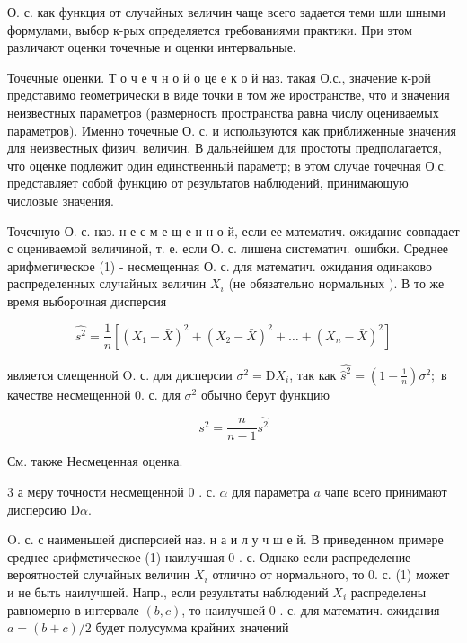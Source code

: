 \documentclass[10pt]{article}
\begin{document}
О. с. как функция от случайных величин чаще всего задается теми шли шными формулами, выбор к-рых определяется требованиями практики. При этом различают оценки точечные и оценки интервальные.



Точечные оценки. Т о ч е ч н о й $о$ це е к о й наз. такая О.с., значение к-рой представимо геометрически в виде точки в том же иространстве, что и значения неизвестных параметров (размерность пространства равна числу оцениваемых параметров). Именно точечные О. с. и используются как приближенные значения для неизвестных физич. величин. В дальнейшем для простоты предполагается, что оценке подлөжит один единственный параметр; в этом случае точечная О.с. представляет собой функцию от результатов наблюдений, принимающую числовые значения.



Точечную О. с. наз. н е с м е щ е н н о й, если ее математич. ожидание совпадает с оцениваемой величиной, т. е. если О. с. лишена систематич. ошибки. Среднее арифметическое (1) - несмещенная О. с. для математич. ожидания одинаково распределенных случайных величин $X_{i}$ (не обязательно нормальных $)$. В то же время выборочная дисперсия



\[

\hat{s^{2}}=\frac{1}{n}\left[\left(X_{1}-\bar{X}\right)^{2}+\left(X_{2}-\bar{X}\right)^{2}+\ldots+\left(X_{n}-\bar{X}\right)^{2}\right]

\]



является смещенной $\mathrm{O}$. с. для дисперсии $\sigma^{2}=\mathrm{D} X_{i}$, так как $\hat{\hat{s}^{2}}=\left(1-\frac{1}{n}\right) \sigma^{2} ;$ в качестве несмещенной 0. с. для $\sigma^{2}$ обычно берут функцию



\[

s^{2}=\frac{n}{n-1} \hat{s^{2}}

\]



См. также Несмеценная оценка.



3 а меру точности несмещенной 0 . с. $\alpha$ для параметра $a$ чапе всего принимают дисперсию $\mathrm{D} \alpha$.



O. с. с наименьшей дисперсией наз. н а и л у ч ш е й. В приведенном примере среднее арифметическое (1) наилучшая 0 . с. Однако если распределение вероятностей случайных величин $X_{i}$ отлично от нормального, то 0. с. (1) может и не быть наилучшей. Напр., если результаты наблюдений $X_{i}$ распределены равномерно в интервале $(b, c)$, то наилучшей 0 . с. для математич. ожидания $a=(b+c) / 2$ будет полусумма крайних значений
\end{document}
